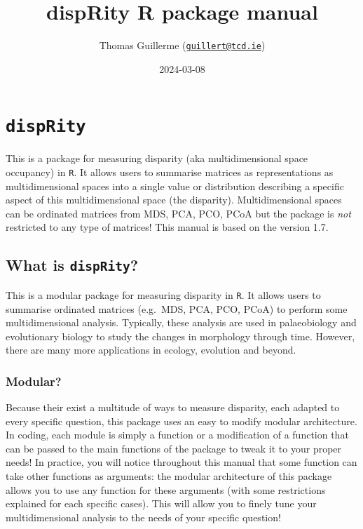 \documentclass[
]{book}
\title{dispRity R package manual}
\author{Thomas Guillerme (\href{mailto:guillert@tcd.ie}{\nolinkurl{guillert@tcd.ie}})}
\date{2024-03-08}
\begin{document}
\maketitle

{
\setcounter{tocdepth}{1}
\tableofcontents
}
\hypertarget{disprity}{%
\chapter{\texorpdfstring{\texttt{dispRity}}{dispRity}}\label{disprity}}

This is a package for measuring disparity (aka multidimensional space occupancy) in \texttt{R}.
It allows users to summarise matrices as representations as multidimensional spaces into a single value or distribution describing a specific aspect of this multidimensional space (the disparity).
Multidimensional spaces can be ordinated matrices from MDS, PCA, PCO, PCoA but the package is \emph{not} restricted to any type of matrices!
This manual is based on the version 1.7.

\hypertarget{what-is-disprity}{%
\section{\texorpdfstring{What is \texttt{dispRity}?}{What is dispRity?}}\label{what-is-disprity}}

This is a modular package for measuring disparity in \texttt{R}.
It allows users to summarise ordinated matrices (e.g.~MDS, PCA, PCO, PCoA) to perform some multidimensional analysis.
Typically, these analysis are used in palaeobiology and evolutionary biology to study the changes in morphology through time.
However, there are many more applications in ecology, evolution and beyond.

\hypertarget{modular}{%
\subsection{Modular?}\label{modular}}

Because their exist a multitude of ways to measure disparity, each adapted to every specific question, this package uses an easy to modify modular architecture.
In coding, each module is simply a function or a modification of a function that can be passed to the main functions of the package to tweak it to your proper needs!
In practice, you will notice throughout this manual that some function can take other functions as arguments: the modular architecture of this package allows you to use any function for these arguments (with some restrictions explained for each specific cases).
This will allow you to finely tune your multidimensional analysis to the needs of your specific question!
\end{document}
